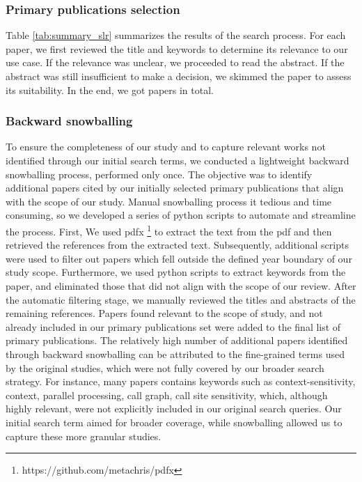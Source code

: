 \subsubsection{Primary publications selection}
Table \ref{tab:summary_slr} summarizes the results of the search process. For each paper, we first reviewed the title and keywords to determine its relevance to our use case. If the relevance was unclear, we proceeded to read the abstract. If the abstract was still insufficient to make a decision, we skimmed the paper to assess its suitability.
In the end, we got \primarypapers papers in total.

\subsubsection{Backward snowballing}
To ensure the completeness of our study and to capture relevant works not identified through our initial search terms, we conducted a lightweight backward snowballing process, performed only once.
The objective was to identify additional papers cited by our initially selected primary publications that align with the scope of our study.
Manual snowballing process it tedious and time consuming, so we developed a series of python scripts to automate and streamline the process.
First, We used pdfx \footnote{https://github.com/metachris/pdfx} to extract the text from the pdf and then retrieved the references from the extracted text.
Subsequently, additional scripts were used to filter out papers which fell outside the defined year boundary of our study scope.
Furthermore, we used python scripts to extract keywords from the paper, and eliminated those that did not align with the scope of our review.
After the automatic filtering stage, we manually reviewed the titles and abstracts of the remaining references. 
Papers found relevant to the scope of study, and not already included in our primary publications set were added to the final list of primary publications.
The relatively high number of additional papers identified through backward snowballing can be attributed to the fine-grained terms used by the original studies, which were not fully covered by our broader search strategy.
For instance, many papers contains keywords such as context-sensitivity, context, parallel processing, call graph, call site sensitivity, which, although highly relevant, were not explicitly included in our original search queries.
Our initial search term aimed for broader coverage, while snowballing allowed us to capture these more granular studies.


